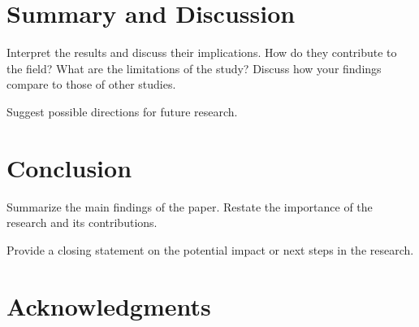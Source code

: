 \documentclass{ReportStyle}
\begin{document}
\section{Summary and Discussion}
Interpret the results and discuss their implications. How do they contribute to the field? What are the limitations of the study?
Discuss how your findings compare to those of other studies.

Suggest possible directions for future research.
 



\section{Conclusion}
Summarize the main findings of the paper.
Restate the importance of the research and its contributions.

Provide a closing statement on the potential impact or next steps in the research.

\section*{Acknowledgments}

\printbibliography
\end{document}
